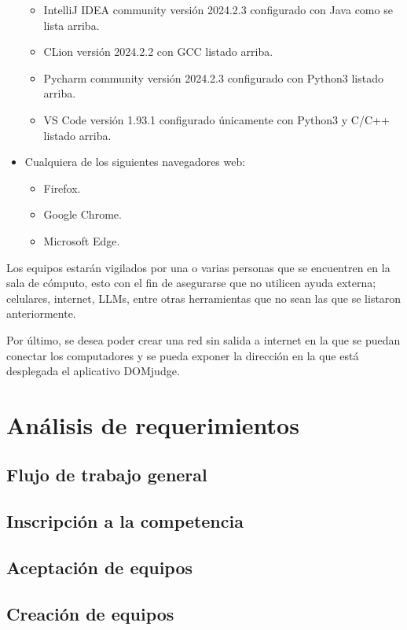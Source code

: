 \documentclass{article}
\begin{document}
\begin{itemize}
\begin{itemize}
          \item IntelliJ IDEA community versión 2024.2.3 configurado con Java como se lista arriba.
          \item CLion versión 2024.2.2 con GCC listado arriba.
          \item Pycharm community versión 2024.2.3 configurado con Python3 listado arriba.
          \item VS Code versión 1.93.1 configurado únicamente con Python3 y C/C++ listado arriba.
        \end{itemize}
  \item Cualquiera de los siguientes navegadores web:
        \begin{itemize}
          \item Firefox.
          \item Google Chrome.
          \item Microsoft Edge.
        \end{itemize}
\end{itemize}


Los equipos estarán vigilados por una o varias personas que se encuentren en la sala de cómputo, esto con el fin de asegurarse que no utilicen ayuda externa; celulares, internet, LLMs, entre otras herramientas que no sean las que se listaron anteriormente.

Por último, se desea poder crear una red sin salida a internet en la que se puedan conectar los computadores y se pueda exponer la dirección en la que está desplegada el aplicativo DOMjudge.


\section{Análisis de requerimientos}

\subsection{Flujo de trabajo general}

\subsection{Inscripción a la competencia}

\subsection{Aceptación de equipos}

\subsection{Creación de equipos}
\end{document}
